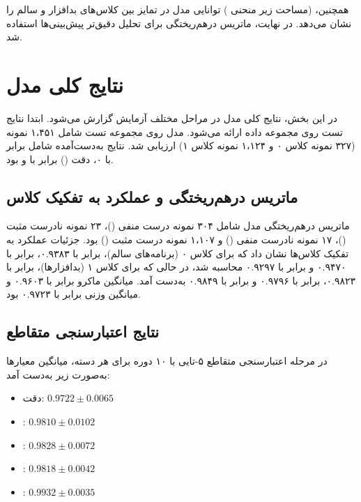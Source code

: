 همچنین،  (مساحت زیر منحنی ) توانایی مدل در تمایز بین کلاس‌های بدافزار و سالم را نشان می‌دهد. در نهایت، ماتریس درهم‌ریختگی  برای تحلیل دقیق‌تر پیش‌بینی‌ها استفاده شد.

\section{نتایج کلی مدل }
در این بخش، نتایج کلی مدل  در مراحل مختلف آزمایش گزارش می‌شود. ابتدا نتایج تست روی مجموعه داده  \cite{Drebin} ارائه می‌شود. مدل  روی مجموعه تست شامل ۱،۴۵۱ نمونه (۳۲۷ نمونه کلاس ۰ و ۱،۱۲۴ نمونه کلاس ۱) ارزیابی شد. نتایج به‌دست‌آمده شامل  برابر با ۰، دقت () برابر با  و   بود.

\subsection{ماتریس درهم‌ریختگی و عملکرد به تفکیک کلاس}
ماتریس درهم‌ریختگی مدل شامل ۳۰۴ نمونه درست منفی ()، ۲۳ نمونه نادرست مثبت ()، ۱۷ نمونه نادرست منفی () و ۱،۱۰۷ نمونه درست مثبت () بود. جزئیات عملکرد به تفکیک کلاس‌ها نشان داد که برای کلاس ۰ (برنامه‌های سالم)،  برابر با ۰.۹۳۸۳،  برابر با ۰.۹۴۷۰ و  برابر با ۰.۹۲۹۷ محاسبه شد، در حالی که برای کلاس ۱ (بدافزارها)،  برابر با ۰.۹۸۲۳،  برابر با ۰.۹۷۹۶ و  برابر با ۰.۹۸۴۹ به‌دست آمد. میانگین ماکرو  برابر با ۰.۹۶۰۳ و میانگین وزنی  برابر با ۰.۹۷۲۳ بود.

\subsection{نتایج اعتبارسنجی متقاطع}
در مرحله اعتبارسنجی متقاطع ۵-تایی با ۱۰ دوره برای هر دسته، میانگین معیارها به‌صورت زیر به‌دست آمد:
\begin{itemize}
    \renewcommand{\labelitemi}{\lr{$\bullet$}}
    \item دقت: $0.9722 \pm 0.0065$
    \item {}: $0.9810 \pm 0.0102$
    \item {}: $0.9828 \pm 0.0072$
    \item {}: $0.9818 \pm 0.0042$
    \item {}: $0.9932 \pm 0.0035$
\end{itemize}

